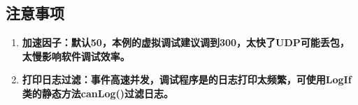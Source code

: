 \subsection{注意事项}
\begin{enumerate}
	\item \bf{加速因子}：默认50，本例的虚拟调试建议调到300，太快了UDP可能丢包，太慢影响软件调试效率。
	\item \bf{打印日志过滤}：事件高速并发，调试程序是的日志打印太频繁，可使用LogIf类的静态方法canLog()过滤日志。
\end{enumerate}
